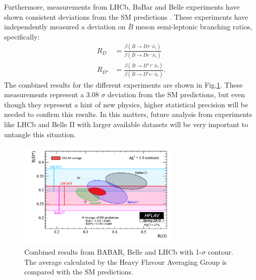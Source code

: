 Furthermore, measurements from LHCb, BaBar and Belle experiments have shown consistent deviations from the SM predictions \cite{Ciezarek_2017}. These experiments have independently measured a deviation on $\bar{B}$ meson semi-leptonic branching ratios, specifically:
\begin{align}
	R_D&=\frac{\beta(\bar{B}\to D\tau^-\bar{\nu}_\tau)}{\beta(\bar{B}\to De^-\bar{\nu}_e)}
	\\
	R_{D^\star}&=\frac{\beta(\bar{B}\to D^\star\tau^-\bar{\nu}_\tau)}{\beta(\bar{B}\to D^\star e^-\bar{\nu}_e)}.
\end{align}
The combined results for the different experiments are shown in Fig.\ref{Fig3}. These measurements represent a 3.08 $\sigma$
 deviation from the SM predictions, but even though they represent a hint of new physics, higher statistical precision will be needed to confirm this results. In this matters, future analysis from experiments like LHCb and Belle II with larger available datasets will be very important to untangle this situation.
 \begin{figure}[h]
 	\centering
 	\includegraphics[width=0.7\textwidth]{figures/Fig3}
 	\caption{Combined results from BABAR, Belle and LHCb with 1-$\sigma$ contour. The average calculated by the Heavy Flavour Averaging Group \cite{HFAG}  is compared with the SM predictions.}
 	\label{Fig3}
 \end{figure}